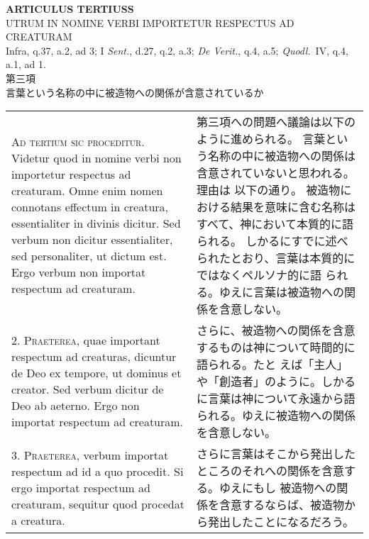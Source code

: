 \documentclass[10pt]{jsarticle} %
\begin{document}
\begin{center}
{\Large {\bf ARTICULUS TERTIUSS}}\\
{\large UTRUM IN NOMINE VERBI IMPORTETUR RESPECTUS AD CREATURAM}\\
{\footnotesize Infra, q.37, a.2, ad 3; I {\itshape Sent.}, d.27, q.2,
 a.3; {\itshape De Verit.}, q.4, a.5; {\itshape Quodl.}~IV, q.4, a.1,
 ad 1.}\\
{\Large 第三項\\言葉という名称の中に被造物への関係が含意されているか}
\end{center}

\begin{longtable}{p{21em}p{21em}}

{\scshape Ad tertium sic proceditur}. Videtur quod in nomine verbi non importetur
respectus ad creaturam. Omne enim nomen connotans effectum in
creatura, essentialiter in divinis dicitur. Sed verbum non dicitur
essentialiter, sed personaliter, ut dictum est. Ergo verbum non
importat respectum ad creaturam.

&

第三項への問題へ議論は以下のように進められる。
言葉という名称の中に被造物への関係は含意されていないと思われる。理由は
 以下の通り。
被造物における結果を意味に含む名称はすべて、神において本質的に語られる。
 しかるにすでに述べられたとおり、言葉は本質的にではなくペルソナ的に語
 られる。ゆえに言葉は被造物への関係を含意しない。

\\



2. {\scshape Praeterea}, quae important respectum ad creaturas, dicuntur de Deo ex
tempore, ut dominus et creator. Sed verbum dicitur de Deo ab
aeterno. Ergo non importat respectum ad creaturam.

&

さらに、被造物への関係を含意するものは神について時間的に語られる。たと
 えば「主人」や「創造者」のように。しかるに言葉は神について永遠から語
 られる。ゆえに被造物への関係を含意しない。

\\



3. {\scshape Praeterea}, verbum importat respectum ad id a quo procedit. Si ergo
importat respectum ad creaturam, sequitur quod procedat a creatura.

&

さらに言葉はそこから発出したところのそれへの関係を含意する。ゆえにもし
 被造物への関係を含意するならば、被造物から発出したことになるだろう。


\end{longtable}
\end{document}
